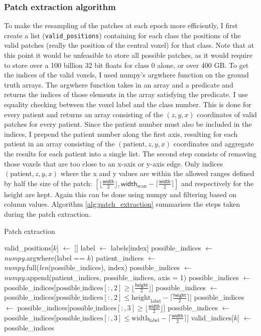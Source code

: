 \documentclass[12pt,a4paper,twoside,openright]{report}
\begin{document}
\subsubsection{Patch extraction algorithm}
To make the resampling of the patches at each epoch more efficiently, I first create a list (\texttt{valid\_positions}) containing for each class the positions of the valid patches (really the position of the central voxel) for that class. Note that at this point it would be unfeasible to store all possible patches, as it would require to store over a 100 billion 32 bit floats for class 0 alone, or over 400 GB. To get the indices of the valid voxels, I used numpy's argwhere function on the ground truth arrays. The argwhere function takes in an array and a predicate and returns the indices of those elements in the array satisfying the predicate. I use equality checking between the voxel label and the class number. This is done for every patient and returns an array consisting of the $(z, y, x)$ coordinates of valid patches for every patient. Since the patient number must also be included in the indices, I prepend the patient number along the first axis, resulting for each patient in an array consisting of the $(\text{patient}, z, y, x)$ coordinates and aggregate the results for each patient into a single list. The second step consists of removing those voxels that are too close to an x-axis or y-axis edge. Only indices $(\text{patient}, z, y, x)$ where the x and y values are  within the allowed ranges defined by half the size of the patch: $[\lfloor \frac{\textsf{width}}{2} \rfloor, \textsf{width}_{\text{scan}} - \lceil \frac{\textsf{width}}{2} \rceil]$ and respectively for the height are kept. Again this can be done using numpy and filtering based on column values. Algorithm \ref{alg:patch_extraction} summarises the steps taken during the patch extraction. 

\begin{algorithm}
\caption{Patch extraction}\label{alg:patch_extraction}
\begin{algorithmic}[1]
	\State valid\_positions[$k$] $\gets$ []
		\State label $\gets$ labels[index] 
		\State possible\_indices $\gets$ \textit{numpy}.argwhere(label == $k$)
		\State patient\_indices $\gets$ \textit{numpy}.full(\textit{len}(possible\_indices), index)
		\State possible\_indices $\gets$ \textit{numpy}.append(patient\_indices, possible\_indices, axis = 1)
		\State
		\State possible\_indices $\gets$ possible\_indices[$\text{possible\_indices}[:,2] \ge \lfloor \frac{\textsf{height}}{2} \rfloor$]
		\State possible\_indices $\gets$ possible\_indices[$\text{possible\_indices}[:,2] \leq \text{height}_{\text{label}} - \lceil \frac{\textsf{height}}{2} \rceil$]
		\State possible\_indices $\gets$ possible\_indices[$\text{possible\_indices}[:,3] \ge \lfloor \frac{\textsf{width}}{2} \rfloor$]
		\State possible\_indices $\gets$ possible\_indices[$\text{possible\_indices}[:,3]  \leq  \text{width}_{\text{label}} - \lceil \frac{\textsf{width}}{2} \rceil$]
		\State
		\State valid\_indices[$k$] $\gets$ possible\_indices
	\EndFor
\EndFor
\end{algorithmic}
\end{algorithm}
\end{document}
